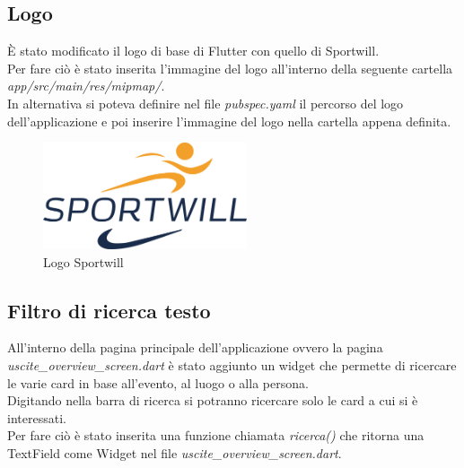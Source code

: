 \subsection{Logo}
È stato modificato il logo di base di Flutter con quello di Sportwill.\\
Per  fare ciò è stato inserita l'immagine del logo all'interno della seguente cartella \textit{app/src/main/res/mipmap/}.\\
In alternativa si poteva definire nel file \textit{pubspec.yaml} il percorso del logo dell'applicazione e poi inserire l'immagine del logo nella cartella appena definita.\\

\begin{figure}[htbp]	
	\centering
	\includegraphics[width=6cm]{immagini/logosportwill.png}
	\caption{Logo Sportwill}
	\label{fig:Logo Sportwill}
\end{figure}

\newpage

\subsection{Filtro di ricerca testo}
All'interno della pagina principale dell'applicazione ovvero la pagina \textit{uscite\_overview\_screen.dart} è stato aggiunto un widget che permette di ricercare le varie card in base all'evento, al luogo o alla persona.\\
Digitando nella barra di ricerca si potranno ricercare solo le card a cui si è interessati.\\
Per fare ciò è stato inserita una funzione chiamata \textit{ricerca()} che ritorna una TextField come Widget nel file \textit{uscite\_overview\_screen.dart}.\\

